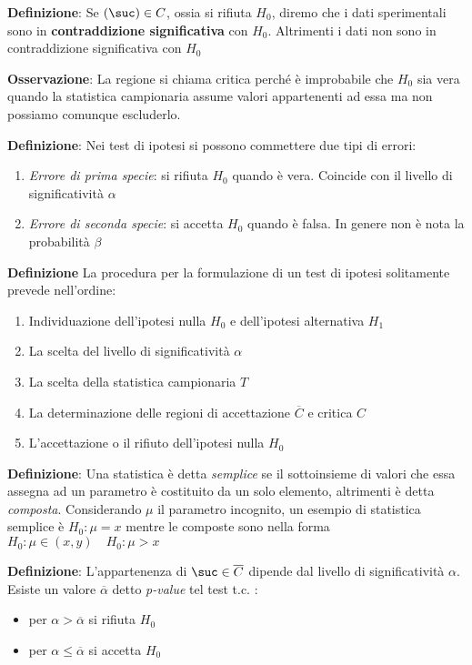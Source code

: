 \ind \textbf{Definizione}: Se $(\suc) \in C$, ossia si rifiuta $H_0$, diremo che i dati sperimentali sono in \textbf{contraddizione significativa} con $H_0$. Altrimenti i dati non sono in contraddizione significativa con $H_0$ \n

\ind \textbf{Osservazione}: La regione si chiama critica perché è improbabile che $H_0$ sia vera quando la statistica campionaria assume valori appartenenti ad essa ma non possiamo comunque escluderlo. \n 


\ind \textbf{Definizione}: Nei test di ipotesi si possono commettere due tipi di errori:
\begin{enumerate}
    \item \textit{Errore di prima specie}: si rifiuta $H_0$ quando è vera. Coincide con il livello di significatività $\alpha$
    \item \textit{Errore di seconda specie}: si accetta $H_0$ quando è falsa. In genere non è nota la probabilità $\beta$
\end{enumerate}

\ind \textbf{Definizione} La procedura per la formulazione di un test di ipotesi solitamente prevede nell'ordine:
\begin{enumerate}
    \item Individuazione dell'ipotesi nulla $H_0$ e dell'ipotesi alternativa $H_1$
    \item La scelta del livello di significatività $\alpha$
    \item La scelta della statistica campionaria $T$ 
    \item La determinazione delle regioni di accettazione $\overline{C}$ e critica $C$
    \item L'accettazione o il rifiuto dell'ipotesi nulla $H_0$
\end{enumerate}

\ind \textbf{Definizione}: Una statistica è detta \textit{semplice} se il sottoinsieme di valori che essa assegna ad un parametro è costituito da un solo elemento, altrimenti è detta \textit{composta}. Considerando $\mu$ il parametro incognito, un esempio di statistica semplice è $H_0: \mu=x$ mentre le composte sono nella forma $H_0: \mu \in (x, y) \quad H_0: \mu > x $ \n

\ind \textbf{Definizione}: L'appartenenza di $\suc \in \overline{C}$ dipende dal livello di significatività $\alpha$. Esiste un valore $\overline{\alpha}$ detto \textit{p-value} tel test t.c. :
\begin{itemize}
    \item per $\alpha > \overline{\alpha}$ si rifiuta $H_0$
    \item per $\alpha \leq \overline{\alpha}$ si accetta $H_0$
\end{itemize}

